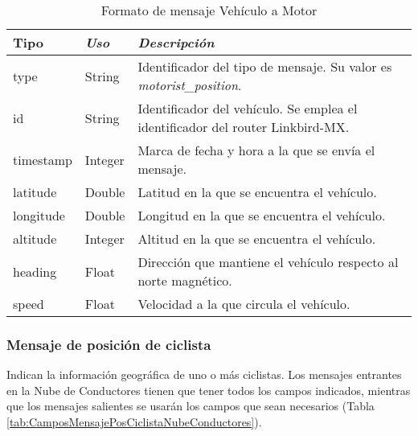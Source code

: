 \begin{table}[H]
	\centering
	\caption{Formato de mensaje Vehículo a Motor}
	\label{tab:CamposMensajePosVehMotNubeConductores}
	\begin{tabular}{lll}
		\toprule
			\textbf{Tipo} & \emph{Uso} & \emph{Descripción}\\
		\midrule
			type			&	String	&	Identificador del tipo de mensaje. Su valor es
														\emph{motorist\_position}.	\\
			id				&	String	&	Identificador del vehículo. Se emplea el
														identificador del router Linkbird-MX.	\\
			timestamp	&	Integer	&	Marca de fecha y hora a la que se envía el mensaje.	\\
			latitude	&	Double	&	Latitud en la que se encuentra el vehículo. \\
			longitude	&	Double	&	Longitud en la que se encuentra el vehículo.	\\
			altitude	&	Integer	&	Altitud en la que se encuentra el vehículo.	\\
			heading		&	Float		&	Dirección que mantiene el vehículo respecto al
														norte magnético.	\\
			speed			&	Float		&	Velocidad a la que circula el vehículo.	\\
		\bottomrule
	\end{tabular}
\end{table}

\subsubsection{Mensaje de posición de ciclista}\label{sssection:MensajePosCiclista}
Indican la información geográfica de uno o más ciclistas. Los mensajes entrantes
en la Nube de Conductores tienen que tener todos los campos indicados, mientras
que los mensajes salientes se usarán los campos que sean necesarios (Tabla
\ref{tab:CamposMensajePosCiclistaNubeConductores}).

